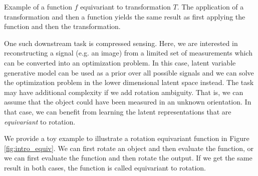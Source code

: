 \begin{marginfigure}
\caption{Example of a function $f$ equivariant to transformation $T$. The application of a transformation and then a function yields the same result as first applying the function and then the transformation.}\label{fig:intro_equiv}
\end{marginfigure}
One such downstream task is compressed sensing. Here, we are interested in reconstructing a signal (e.g. an image) from a limited set of measurements which can be converted into an optimization problem. In this case, latent variable generative model can be used as a prior over all possible signals and we can solve the optimization problem in the lower dimensional latent space instead. 
The task may have additional complexity if we add rotation ambiguity. That is, we can assume that the object could have been measured in an unknown orientation. In that case, we can benefit from learning the latent representations that are \textit{equivariant} to rotation. 

We provide a toy example to illustrate a rotation equivariant function in Figure \ref{fig:intro_equiv}. We can first rotate an object and then evaluate the function, or we can first evaluate the function and then rotate the output. If we get the same result in both cases, the function is called equivariant to rotation. 

